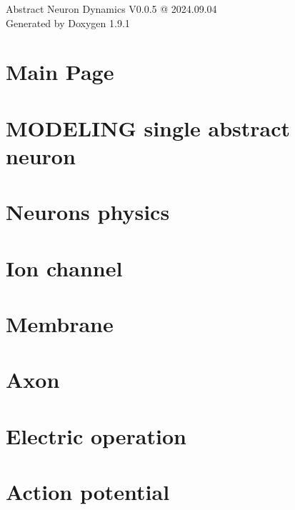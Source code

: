 \let\mypdfximage\pdfximage\def\pdfximage{\immediate\mypdfximage}\documentclass[twoside]{book}
\newcommand{\+}{\discretionary{\mbox{\scriptsize$\hookleftarrow$}}{}{}}
\newcommand{\clearemptydoublepage}{%
  \newpage{\pagestyle{empty}\cleardoublepage}%
}
\begin{document}
\raggedbottom

\begin{titlepage}
\vspace*{7cm}
\begin{center}%
{\Large Abstract Neuron Dynamics V0.0.5 @ 2024.09.04 }\\
\vspace*{1cm}
{\large Generated by Doxygen 1.9.1}\\
\end{center}
\end{titlepage}
\clearemptydoublepage
{}
\tableofcontents
\clearemptydoublepage
{}

\chapter{Main Page}
\label{index}
\chapter{MODELING single abstract neuron}
\label{MODELING_SINGLE_MAIN_PAGE}

\chapter{Neuron\textquotesingle{}s physics}
\label{MODELING_SINGLE_ABSTRACT_MEMBRANE_PAGE}

\chapter{Ion channel}
\label{MODELING_SINGLE_ION_CHANNEL_PAGE}

\chapter{Membrane}
\label{MODELING_SINGLE_MEMBRANE_PAGE}

\chapter{Axon}
\label{MODELING_SINGLE_AXON_PAGE}

\chapter{Electric operation}
\label{MODELING_SINGLE_ELECTRIC_PAGE}

\chapter{Action potential}
\label{MODELING_SINGLE_ACTION_POTENTIAL_PAGE}

\end{document}
